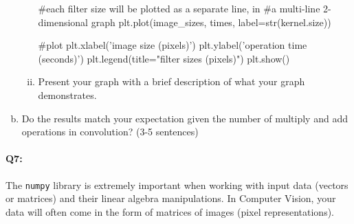 \begin{enumerate}[(a)]
\begin{enumerate}[(i)]
\begin{python}
    #each filter size will be plotted as a separate line, in
    #a multi-line 2-dimensional graph
    plt.plot(image_sizes, times, label=str(kernel.size))

#plot
plt.xlabel('image size (pixels)')
plt.ylabel('operation time (seconds)')
plt.legend(title="filter sizes (pixels)")
plt.show()

\end{python}
    
    
    \item
    Present your graph with a brief description of what your graph demonstrates.
    
    
    \end{enumerate}

\item
    Do the results match your expectation given the number of multiply and add operations in convolution? (3-5 sentences)
    
    
\end{enumerate}






\pagebreak
\paragraph{Q7:} The \texttt{numpy} library is extremely important when working with input data (vectors or matrices) and their linear algebra manipulations. In Computer Vision, your data will often come in the form of matrices of images (pixel representations). 

